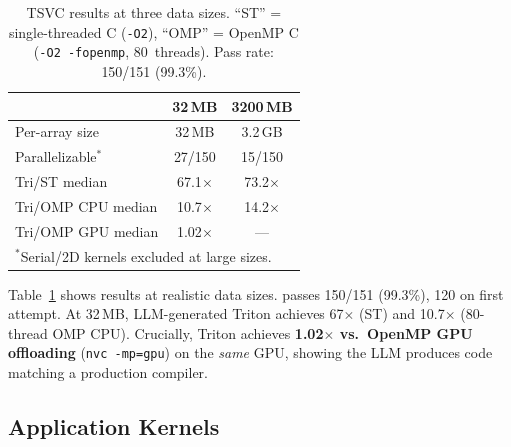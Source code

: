 \begin{table}[t]
  \caption{TSVC results at three data sizes.  ``ST'' = single-threaded
    C (\texttt{-O2}), ``OMP'' = OpenMP C (\texttt{-O2 -fopenmp},
    80~threads). Pass rate: 150/151 (99.3\%).}
  \label{tab:tsvc}
  \centering\small
  \begin{tabular}{lcc}
    \toprule
    & \textbf{32\,MB} & \textbf{3200\,MB} \\
    \midrule
    Per-array size     & 32\,MB & 3.2\,GB \\
    Parallelizable$^*$ & 27/150 & 15/150  \\
    \midrule
    Tri/ST median      & 67.1$\times$ & 73.2$\times$ \\
    Tri/OMP CPU median & 10.7$\times$ & 14.2$\times$ \\
    Tri/OMP GPU median & 1.02$\times$ & ---           \\
    \bottomrule
    \multicolumn{3}{l}{\scriptsize $^*$Serial/2D kernels excluded at large sizes.}
  \end{tabular}
\end{table}

Table~\ref{tab:tsvc} shows results at realistic data sizes.
\sysname passes 150/151 (99.3\%), 120 on first attempt.
At 32\,MB, LLM-generated Triton achieves 67$\times$ (ST)
and 10.7$\times$ (80-thread OMP CPU).  Crucially, Triton
achieves \textbf{1.02$\times$ vs.\ OpenMP GPU offloading}
(\texttt{nvc~-mp=gpu}) on the \emph{same} GPU, showing the
LLM produces code matching a production compiler.


\subsection{Application Kernels}
\label{sec:realworld}

